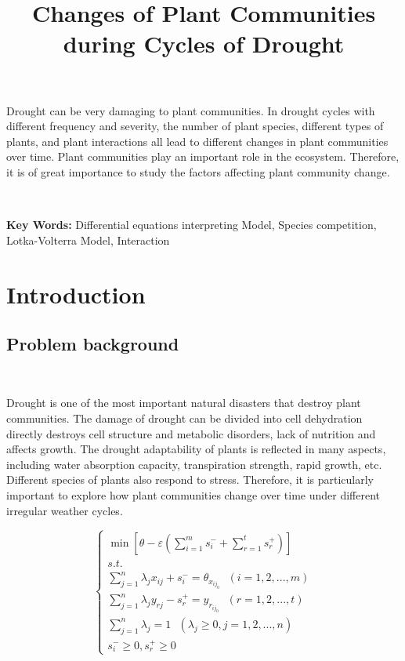 \documentclass{headFile4}
\title{\bfseries {\large Changes of Plant Communities during Cycles of Drought}
}
\begin{document}
\vspace*{0.5em}
\begin{summary}

Drought can be very damaging to plant communities. In drought cycles with different frequency and severity, the number of plant species, different types of plants, and plant interactions all lead to different changes in plant communities over time. Plant communities play an important role in the ecosystem. Therefore, it is of great importance to study the factors affecting plant community change.

\

\noindent \textbf{Key Words:} Differential equations interpreting Model, Species competition, Lotka-Volterra Model, Interaction

\end{summary}

\maketitle
\newpage
\tableofcontents
\newpage
\setcounter{page}{1}


\section{Introduction}
\subsection{Problem background}
\

Drought is one of the most important natural disasters that destroy plant communities. The damage of drought can be divided into cell dehydration directly destroys cell structure and metabolic disorders, lack of nutrition and affects growth. The drought adaptability of plants is reflected in many aspects, including water absorption capacity, transpiration strength, rapid growth, etc. Different species of plants also respond to stress. Therefore, it is particularly important to explore how plant communities change over time under different irregular weather cycles.
\begin{large}
\begin{equation}
\begin{cases}
    \min[\theta-\varepsilon(\sum\limits_{i=1}^{m}s_{i}^{-}+\sum\limits_{r=1}^{t}s_{r}^{+})]
    \\
    s.t.
    \\
    \sum\limits_{j=1}^{n}\lambda_jx_{ij}+s_{i}^{-}=\theta_{x_{ij_0}}\ \ \ (i=1,2,...,m)
    \\
    \sum\limits_{j=1}^{n}\lambda_jy_{rj}-s_{r}^{+}=y_{r_{ij_0}}\ \ \ (r=1,2,...,t)
    \\
    \sum\limits_{j=1}^{n}\lambda_j=1\ \ \ (\lambda_j\geqslant0,j=1,2,...,n)
    \\
    s_{i}^{-}\geqslant0,s_{r}^{+}\geqslant0
\end{cases}
\end{equation}
\end{large}
\end{document}
